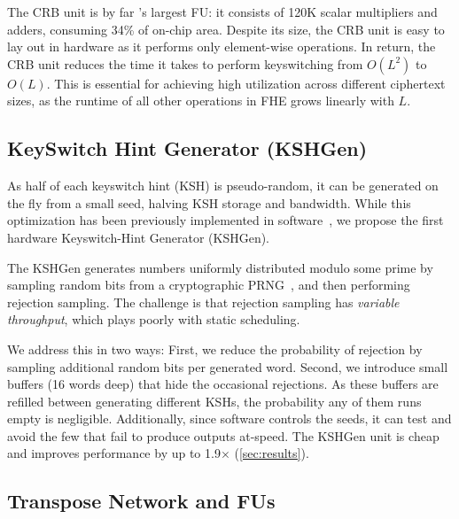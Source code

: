 The CRB unit is by far \name's largest FU: it consists of 120K scalar multipliers and adders,
consuming 34\% of on-chip area.
Despite its size, the CRB unit is easy to lay out in hardware as it performs only
element-wise operations.
In return, the CRB unit reduces the time it takes to perform keyswitching from
$O(L^2)$ to $O(L)$.
This is essential for achieving high utilization across different ciphertext
sizes, as the runtime of all other operations in FHE grows linearly with $L$.

\subsection{KeySwitch Hint Generator (KSHGen)}
\label{sec:prg}
As half of each keyswitch hint (KSH) is pseudo-random, it can be generated on
the fly from a small seed, halving KSH storage and bandwidth.
While this optimization has been previously implemented in
software~\cite{halevi:2020:design}, we propose the first hardware Keyswitch-Hint
Generator (KSHGen).


The KSHGen generates numbers uniformly distributed modulo some prime by
sampling random bits from a cryptographic
PRNG~\cite{bertoni:2018:kangarootwelve}, and then performing rejection
sampling.
The challenge is that rejection sampling has \emph{variable throughput}, which
plays poorly with static scheduling.

We address this in two ways:
First, we reduce the probability of rejection by sampling additional random
bits per generated word.
Second, we introduce small buffers (16 words deep) that hide the occasional
rejections.
As these buffers are refilled between generating different KSHs, the probability
any of them runs empty is negligible.
Additionally, since software controls the seeds, it can test and avoid
the few that fail to produce outputs at-speed.
%
The KSHGen unit is cheap and improves performance by up to
1.9$\times$ %
(\autoref{sec:results}).

\subsection{Transpose Network and FUs}\label{sec:network}

